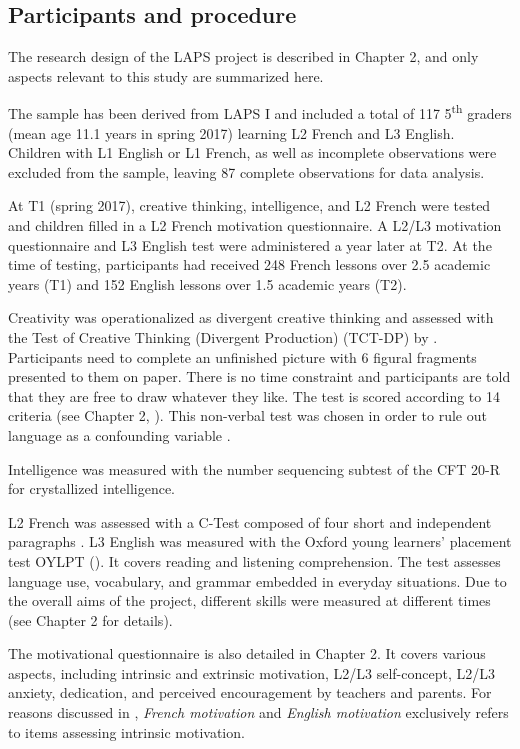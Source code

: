 \documentclass[output=paper]{langsci/langscibook}
\begin{document}
\subsection{Participants and procedure}

The research design of the LAPS project is described in Chapter 2, and only aspects relevant to this study are summarized here.

The sample has been derived from LAPS I and included a total of 117 5\textsuperscript{th} graders (mean age 11.1 years in spring 2017) learning L2 French and L3 English. Children with L1 English or L1 French, as well as incomplete observations were excluded from the sample, leaving 87 complete observations for data analysis.

At T1 (spring 2017), creative thinking, intelligence, and L2 French were tested and children filled in a L2 French motivation questionnaire. A L2/L3 motivation questionnaire and L3 English test were administered a year later at T2. At the time of testing, participants had received 248 French lessons over 2.5 academic years (T1) and 152 English lessons over 1.5 academic years (T2). 

Creativity was operationalized as divergent creative thinking and assessed with the Test of Creative Thinking (Divergent Production) (TCT-DP) by \citet{UrbanJellen1995}. Participants need to complete an unfinished picture with 6 figural fragments presented to them on paper. There is no time constraint and participants are told that they are free to draw whatever they like. The test is scored according to 14 criteria (see Chapter 2, ). This non-verbal test was chosen in order to rule out language as a confounding variable \citep{Simonton2008}.

Intelligence was measured with the number sequencing subtest of the CFT 20-R \citep{Weiss2006} for crystallized intelligence. 

L2 French was assessed with a C-Test composed of four short and independent paragraphs \citep{Grotjahn2002}. L3 English was measured with the Oxford young learners’ placement test OYLPT (\citealt{Testing2013}). It covers reading and listening comprehension. The test assesses language use, vocabulary, and grammar embedded in everyday situations. Due to the overall aims of the project, different skills were measured at different times (see Chapter 2 for details).

The motivational questionnaire is also detailed in Chapter 2. It covers various aspects, including intrinsic and extrinsic motivation, L2/L3 self-concept, L2/L3 anxiety, dedication, and perceived encouragement by teachers and parents. For reasons discussed in , \textit{French motivation} and \textit{English motivation} exclusively refers to items assessing intrinsic motivation. 
\end{document}
